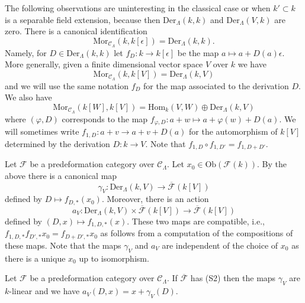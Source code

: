 \noindent
The following observations are uninteresting in the classical case or when
$k' \subset k$ is a separable field extension, because then
$\text{Der}_\Lambda(k, k)$ and $\text{Der}_\Lambda(V, k)$ are zero.
There is a canonical identification
$$
\text{Mor}_{\mathcal{C}_\Lambda}(k, k[\epsilon]) =
\text{Der}_\Lambda(k, k).
$$
Namely, for $D \in \text{Der}_\Lambda(k, k)$ let $f_D : k \to k[\epsilon]$
be the map $a \mapsto a + D(a)\epsilon$. More generally, given a finite
dimensional vector space $V$ over $k$ we have
$$
\text{Mor}_{\mathcal{C}_\Lambda}(k, k[V]) =
\text{Der}_\Lambda(k, V)
$$
and we will use the same notation $f_D$ for the map associated to the
derivation $D$. We also have
$$
\text{Mor}_{\mathcal{C}_\Lambda}(k[W], k[V]) =
\text{Hom}_k(V, W) \oplus \text{Der}_\Lambda(k, V)
$$
where $(\varphi, D)$ corresponds to the map
$f_{\varphi, D} : a + w \mapsto a + \varphi(w) + D(a)$. We will sometimes write
$f_{1, D} : a + v \to a + v + D(a)$ for the automorphism
of $k[V]$ determined by the derivation $D : k \to V$. Note that
$f_{1, D} \circ f_{1, D'} = f_{1, D + D'}$.

\medskip\noindent
Let $\mathcal{F}$ be a predeformation category over $\mathcal{C}_\Lambda$.
Let $x_0 \in \text{Ob}(\mathcal{F}(k))$. By the above there is a canonical
map
$$
\gamma_V :
\text{Der}_\Lambda(k, V)
\longrightarrow
\overline{\mathcal{F}}(k[V])
$$
defined by $D \mapsto f_{D, *}(x_0)$. Moreover, there is an action
$$
a_V : \text{Der}_\Lambda(k, V) \times \overline{\mathcal{F}}(k[V])
\longrightarrow
\overline{\mathcal{F}}(k[V])
$$
defined by $(D, x) \mapsto f_{1, D, *}(x)$. These two maps are compatible,
i.e., $f_{1, D, *}f_{D', *}x_0 = f_{D + D', *}x_0$ as follows from a
computation of the compositions of these maps. Note that the maps
$\gamma_V$ and $a_V$ are independent of the choice of $x_0$ as there
is a unique $x_0$ up to isomorphism.

\begin{lemma}
\label{lemma-action-linear}
Let $\mathcal{F}$ be a predeformation category over $\mathcal{C}_\Lambda$.
If $\overline{\mathcal{F}}$ has (S2) then the maps $\gamma_V$ are
$k$-linear and we have $a_V(D, x) = x + \gamma_V(D)$.
\end{lemma}

